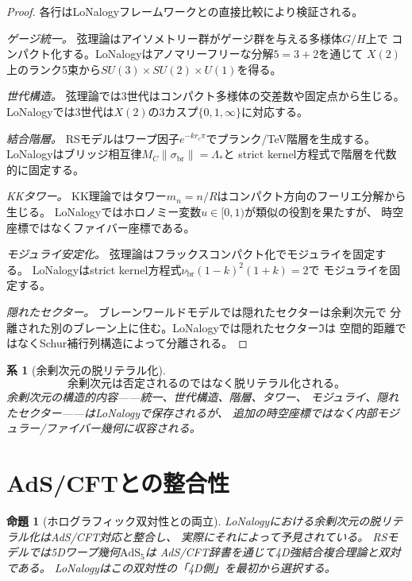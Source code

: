 \documentclass[12pt]{article}
\theoremstyle{plain}
\newtheorem{proposition}[theorem]{命題}
\newtheorem{corollary}[theorem]{系}
\theoremstyle{definition}
\numberwithin{equation}{section}
\newcommand{\br}{\mathrm{br}}
\newcommand{\fI}{\mathfrak{I}}
\begin{document}
\begin{proof}
各行はLoNalogyフレームワークとの直接比較により検証される。

\emph{ゲージ統一。}
弦理論はアイソメトリー群がゲージ群を与える多様体$G/H$上で
コンパクト化する。LoNalogyはアノマリーフリーな分解$5=3+2$を通じて
$X(2)$上のランク5束から$SU(3)\times SU(2)\times U(1)$を得る。

\emph{世代構造。}
弦理論では3世代はコンパクト多様体の交差数や固定点から生じる。
LoNalogyでは3世代は$X(2)$の3カスプ$\{0,1,\infty\}$に対応する。

\emph{結合階層。}
RSモデルはワープ因子$e^{-kr_c\pi}$でプランク/TeV階層を生成する。
LoNalogyはブリッジ相互律$M_C\|\sigma_{\br}\|=\Lambda_*$と
strict kernel方程式で階層を代数的に固定する。

\emph{KKタワー。}
KK理論ではタワー$m_n=n/R$はコンパクト方向のフーリエ分解から生じる。
LoNalogyではホロノミー変数$u\in[0,1)$が類似の役割を果たすが、
時空座標ではなくファイバー座標である。

\emph{モジュライ安定化。}
弦理論はフラックスコンパクト化でモジュライを固定する。
LoNalogyはstrict kernel方程式$\nu_{\br}(1-k)^2(1+k)=2$で
モジュライを固定する。

\emph{隠れたセクター。}
ブレーンワールドモデルでは隠れたセクターは余剰次元で
分離された別のブレーン上に住む。LoNalogyでは隠れたセクター$\fI$は
空間的距離ではなくSchur補行列構造によって分離される。
\end{proof}

\begin{corollary}[余剰次元の脱リテラル化]
\begin{equation}
\boxed{\text{余剰次元は否定されるのではなく脱リテラル化される。}}
\end{equation}
余剰次元の構造的内容——統一、世代構造、階層、タワー、
モジュライ、隠れたセクター——はLoNalogyで保存されるが、
追加の時空座標ではなく内部モジュラー/ファイバー幾何に収容される。
\end{corollary}


\section{AdS/CFTとの整合性}\label{sec:adscft}

\begin{proposition}[ホログラフィック双対性との両立]\label{prop:adscft}
LoNalogyにおける余剰次元の脱リテラル化はAdS/CFT対応と整合し、
実際にそれによって予見されている。
RSモデルでは5Dワープ幾何$\mathrm{AdS}_5$は
AdS/CFT辞書を通じて4D強結合複合理論と双対である。
LoNalogyはこの双対性の「4D側」を最初から選択する。
\end{proposition}
\end{document}
